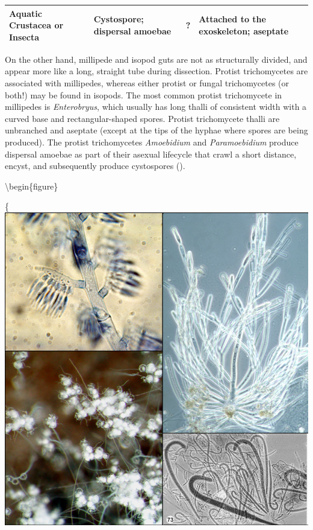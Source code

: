 \documentclass[]{book}
\begin{document}
\begin{longtable}[]{@{}lllll@{}}
\begin{minipage}[t]{0.17\columnwidth}
Aquatic Crustacea or Insecta\strut
\end{minipage} & \begin{minipage}[t]{0.17\columnwidth}\raggedright
Cystospore; dispersal amoebae\strut
\end{minipage} & \begin{minipage}[t]{0.17\columnwidth}\raggedright
?\strut
\end{minipage} & \begin{minipage}[t]{0.17\columnwidth}\raggedright
Attached to the exoskeleton; aseptate\strut
\end{minipage}\tabularnewline
\bottomrule
\end{longtable}

On the other hand, millipede and isopod guts are not as structurally divided, and appear more like a long, straight tube during dissection. Protist trichomycetes are associated with millipedes, whereas either protist or fungal trichomycetes (or both!) may be found in isopods. The most common protist trichomycete in millipedes is \emph{Enterobryus}, which usually has long thalli of consistent width with a curved base and rectangular-shaped spores. Protist trichomycete thalli are unbranched and aseptate (except at the tips of the hyphae where spores are being produced). The protist trichomycetes \emph{Amoebidium} and \emph{Paramoebidium} produce dispersal amoebae as part of their asexual lifecycle that crawl a short distance, encyst, and subsequently produce cystospores (\citet{Reynolds_2017}).

\textbackslash begin\{figure\}

\{\centering \includegraphics[width=12.08in]{img/Ch4_Fig1}
\end{document}
